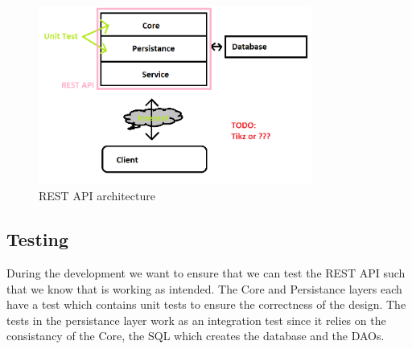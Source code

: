 \begin{figure}[h]
    \centering
    \includegraphics[width=0.8\textwidth]{figures/wip-stack.png}
    \caption{REST API architecture}
    \label{fig:rest-architecture}
\end{figure}


\subsection{Testing}
During the development we want to ensure that we can test the REST API such that we know that is working as intended. 
The Core and Persistance layers each have a test which contains unit tests to ensure the correctness of the design. 
The tests in the persistance layer work as an integration test since it relies on the consistancy of the Core, the SQL which creates the database and the DAOs.  

